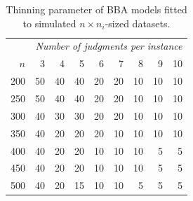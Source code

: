 \documentclass[12pt,]{article}
\begin{document}
\begin{table}[!h]

\caption{\label{tab:unnamed-chunk-2}Thinning parameter of BBA models fitted to simulated $n\times n_i$-sized datasets.}
\centering
\begin{tabular}{rrrrrrrrr}
\toprule
\multicolumn{1}{c}{\em  } & \multicolumn{8}{c}{\em Number of judgments per instance} \\
\cmidrule(l{2pt}r{2pt}){2-9}
$n$ & 3 & 4 & 5 & 6 & 7 & 8 & 9 & 10\\
\midrule
200 & 50 & 40 & 40 & 20 & 20 & 10 & 10 & 10\\
250 & 50 & 40 & 40 & 20 & 20 & 10 & 10 & 10\\
300 & 40 & 30 & 30 & 20 & 20 & 10 & 10 & 10\\
350 & 40 & 20 & 20 & 20 & 10 & 10 & 10 & 10\\
400 & 40 & 20 & 20 & 10 & 10 & 10 & 5 & 5\\
450 & 40 & 20 & 20 & 10 & 10 & 10 & 5 & 5\\
500 & 40 & 20 & 15 & 10 & 10 & 5 & 5 & 5\\
\bottomrule
\end{tabular}
\end{table}
\end{document}
